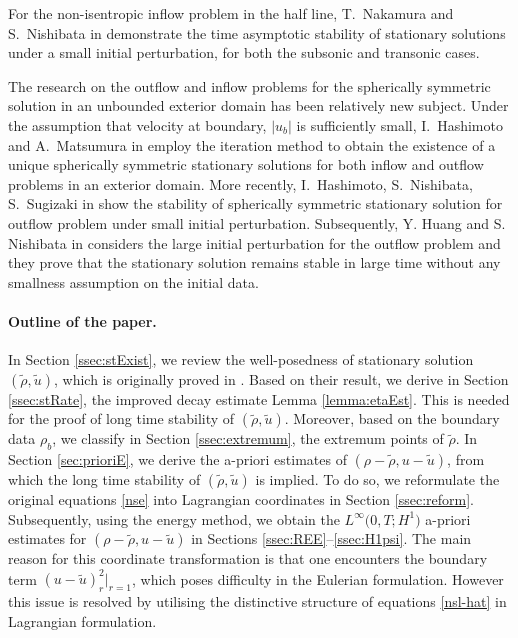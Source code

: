 \documentclass[a4paper,12pt,draft]{article}
\theoremstyle{remark}
\def\ut{\tilde{u}}
\def\rt{\tilde{\rho}}
\begin{document}
For the non-isentropic inflow problem in the half line, T.~Nakamura and S.~Nishibata in \cite{NN} demonstrate the time asymptotic stability of stationary solutions under a small initial perturbation, for both the subsonic and transonic cases. 

The research on the outflow and inflow problems for the spherically symmetric solution in an unbounded exterior domain has been relatively new subject. Under the assumption that velocity at boundary, $|u_b|$ is sufficiently small, I.~Hashimoto and A.~Matsumura in \cite{h-m21} employ the iteration method to obtain the existence of a unique spherically symmetric stationary solutions for both inflow and outflow problems in an exterior domain. More recently, I.~Hashimoto, S.~Nishibata, S.~Sugizaki in \cite{h-n-s23} show the stability of spherically symmetric stationary solution for outflow problem under small initial perturbation. Subsequently, Y. Huang and S. Nishibata in \cite{h-n24} considers the large initial perturbation for the outflow problem and they prove that the stationary solution remains stable in large time without any smallness assumption on the initial data.  

\paragraph{Outline of the paper.} In Section \ref{ssec:stExist}, we review the well-posedness of stationary solution $(\rt,\ut)$, which is originally proved in \cite{h-m21}. Based on their result, we derive in Section \ref{ssec:stRate}, the improved decay estimate Lemma \ref{lemma:etaEst}. This is needed for the proof of long time stability of $(\rt,\ut)$. Moreover, based on the boundary data $\rho_b$, we classify in Section \ref{ssec:extremum}, the extremum points of $\rt$. In Section \ref{sec:prioriE}, we derive the a-priori estimates of $(\rho-\rt,u-\ut)$, from which the long time stability of $(\rt,\ut)$ is implied. To do so, we reformulate the original equations \eqref{nse} into Lagrangian coordinates in Section \ref{ssec:reform}. Subsequently, using the energy method, we obtain the $L^{\infty}\big(0,T;H^1\big)$ a-priori estimates for $(\rho-\rt,u-\ut)$ in Sections \ref{ssec:REE}--\ref{ssec:H1psi}. The main reason for this coordinate transformation is that one encounters the boundary term $(u-\ut)_r^2\vert_{r=1}$, which poses difficulty in the Eulerian formulation. However this issue is resolved by utilising the distinctive structure of equations \eqref{nsl-hat} in Lagrangian formulation.
\end{document}
